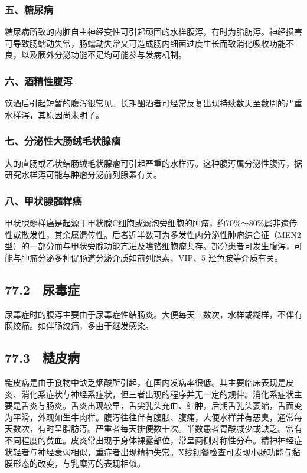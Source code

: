 \subsubsection{五、糖尿病}

糖尿病所致的内脏自主神经变性可引起顽固的水样腹泻，有时为脂肪泻。神经损害可导致肠蠕动失常，肠蠕动失常又可造成肠内细菌过度生长而致消化吸收功能不良，以及胰外分泌功能不足均可能参与发病机制。

\subsubsection{六、酒精性腹泻}

饮酒后引起短暂的腹泻很常见。长期酗酒者可经常反复出现持续数天至数周的严重水样泻，其原因尚未明了。

\subsubsection{七、分泌性大肠绒毛状腺瘤}

大的直肠或乙状结肠绒毛状腺瘤可引起严重的水样泻。这种腹泻属分泌性腹泻，据研究水样泻可能与肿瘤分泌前列腺素有关。

\subsubsection{八、甲状腺髓样癌}

甲状腺髓样癌是起源于甲状腺C细胞或滤泡旁细胞的肿瘤，约70\%～80\%属非遗传性或散发性，其余属遗传性。后者近半数可为多发性内分泌性肿瘤综合征（MEN2型）的一部分而与甲状旁腺功能亢进及嗜铬细胞瘤共存。部分患者可发生腹泻，可能与肿瘤分泌多种促肠道分泌介质如前列腺素、VIP、5-羟色胺等介质有关。

\subsection{77.2　尿毒症}

尿毒症时的腹泻主要由于尿毒症性结肠炎。大便每天三数次，水样或糊样，不伴有肠绞痛。如伴肠绞痛，多由于继发感染。

\subsection{77.3　糙皮病}

糙皮病是由于食物中缺乏烟酸所引起，在国内发病率很低。其主要临床表现是皮炎、消化系症状与神经系症状，但三者出现的程序并无一定的规律。消化系症状主要是舌炎与肠炎。舌炎出现较早，舌尖乳头充血、红肿，后期舌乳头萎缩，舌面变为平滑，外观如生牛肉样。腹泻往往伴有腹胀、腹痛，大便水样并有恶臭，通常每天数次，有时呈脂肪泻。严重者每天排便数十次。半数患者胃酸减少或缺乏。常有不同程度的贫血。皮炎常出现于身体裸露部位，常呈两侧对称性分布。精神神经症状轻者与神经衰弱相似，重症者出现精神失常。X线钡餐检查可发现小肠功能与黏膜形态的改变，与乳糜泻的表现相似。

